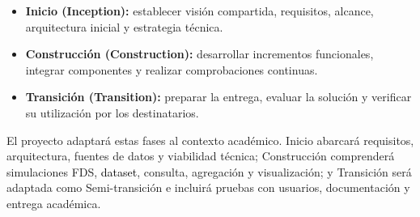 \begin{itemize}
    \item \textbf{Inicio (Inception):} establecer visión compartida, requisitos, alcance, arquitectura inicial y estrategia técnica.

    \item \textbf{Construcción (Construction):} desarrollar incrementos funcionales, integrar componentes y realizar comprobaciones continuas.

    \item \textbf{Transición (Transition):} preparar la entrega, evaluar la solución y verificar su utilización por los destinatarios.
\end{itemize}

El proyecto adaptará estas fases al contexto académico. Inicio abarcará requisitos, arquitectura, fuentes de datos y viabilidad técnica; Construcción comprenderá simulaciones FDS, \textcolor{black}{dataset}, consulta, agregación y visualización; y Transición será adaptada como Semi-transición e incluirá pruebas con usuarios, documentación y entrega académica.